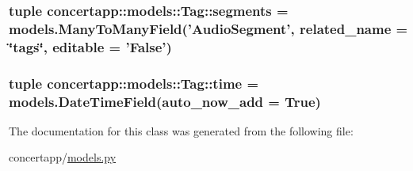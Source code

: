 \label{classconcertapp_1_1models_1_1_tag_a004abf3b743cd22d1f0c3fd0a4fe4549}
\hypertarget{classconcertapp_1_1models_1_1_tag_a7240d312ef18ba168eeba6f5bd8efbab}{
\subsubsection[{segments}]{\setlength{\rightskip}{0pt plus 5cm}tuple {\bf concertapp::models::Tag::segments} = models.ManyToManyField('{\bf AudioSegment}', related\_\-name = \char`\"{}tags\char`\"{}, editable = 'False')}}
\label{classconcertapp_1_1models_1_1_tag_a7240d312ef18ba168eeba6f5bd8efbab}
\hypertarget{classconcertapp_1_1models_1_1_tag_aae92f65925072a9f91d2affdb0e18083}{
\subsubsection[{time}]{\setlength{\rightskip}{0pt plus 5cm}tuple {\bf concertapp::models::Tag::time} = models.DateTimeField(auto\_\-now\_\-add = True)}}
\label{classconcertapp_1_1models_1_1_tag_aae92f65925072a9f91d2affdb0e18083}


The documentation for this class was generated from the following file:\begin{DoxyCompactItemize}
\item 
concertapp/\hyperlink{models_8py}{models.py}\end{DoxyCompactItemize}
